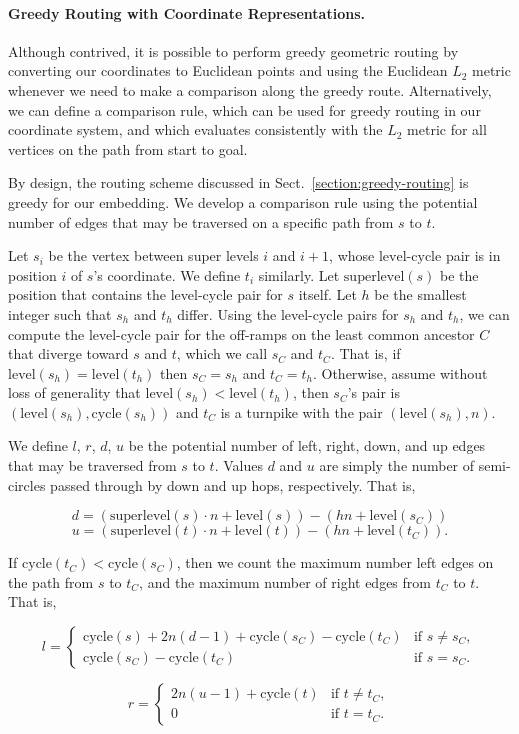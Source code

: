 \documentclass[11pt]{article}
\newcommand{\cycle}{\mathrm{cycle}}
\newcommand{\level}{\mathrm{level}}
\newcommand{\superlevel}{\mathrm{superlevel}}
\renewcommand{\subsection}[1]{\paragraph{#1.}}
\begin{document}
\subsection{Greedy Routing with Coordinate Representations}
\ifFull
Although contrived, it is possible to perform greedy geometric
routing by converting our coordinates to Euclidean points and using
the Euclidean $L_2$ metric whenever we need to make a comparison 
along the greedy route. Alternatively, we can define a comparison rule,
which can be used for greedy routing
in our coordinate system, and which evaluates consistently with the 
$L_2$ metric for all vertices on the path from start to goal.
\fi

By design, the routing scheme discussed in Sect.~\ref{section:greedy-routing}
is greedy for our embedding. We develop a comparison rule 
using the potential number of edges that may be traversed on
a specific path from $s$ to $t$.

Let $s_i$ be the vertex between super levels $i$ and $i+1$, whose 
$\level$-$\cycle$ pair is in position $i$ of $s$'s coordinate.
We define $t_i$ similarly. Let $\superlevel(s)$ be the position that 
contains the level-cycle pair for $s$ itself.
Let $h$ be the smallest integer such that $s_h$ and $t_h$ differ.
Using the level-cycle pairs for $s_h$ and $t_h$, we
can compute the level-cycle pair for the off-ramps on the least
common ancestor $C$ that diverge toward $s$ and $t$, which we 
call $s_C$ and $t_C$. That is, if 
$\level(s_h) = \level(t_h)$ then $s_C = s_h$ and
$t_C = t_h$. Otherwise, assume without loss of generality that
$\level(s_h) < \level(t_h)$, then $s_C$'s pair is $(\level(s_h),\cycle(s_h))$
and $t_C$ is a turnpike with the pair $(\level(s_h), n)$. 

We define $l$, $r$, $d$, $u$ be the potential number of left, 
right, down, and up edges that may be traversed from $s$ to $t$. Values 
$d$ and $u$ are simply the number of semi-circles passed through by 
down and up hops, respectively. That is,

{\small
\[d = (\superlevel(s)\cdot n + \level(s)) - (hn + \level(s_C))\]
\[u = (\superlevel(t)\cdot n + \level(t)) - (hn + \level(t_C)).\]
}

If $\cycle(t_C) < \cycle(s_C)$, then we count the maximum number left 
edges on the path from $s$ to $t_C$, and the maximum number of right 
edges from $t_C$ to $t$. That is,

{\small
\[l = \begin{cases}
       \cycle(s) + 2n(d-1) + \cycle(s_C) - \cycle(t_C)&\text{if $s \neq s_C$}, \\
       \cycle(s_C) - \cycle(t_C) &\text{if $s = s_C$}. \end{cases}\]

\[r = \begin{cases}
       2n(u-1) + \cycle(t) &\text{if $t \neq t_C$}, \\
       0 &\text{if $t = t_C$}. \end{cases}\]
}
\end{document}
